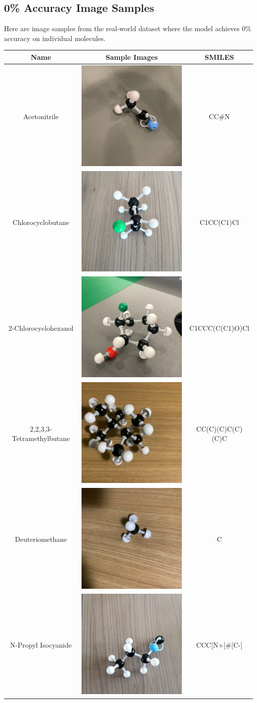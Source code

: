 \documentclass[12pt]{article}
\begin{document}
\subsection*{0\% Accuracy Image Samples}
Here are image samples from the real-world dataset where the model achieves 0\% accuracy on individual molecules. \\
\begin{center}
    \begin{tabular}{c|c|c}
        Name & Sample Images   & SMILES  \\ \hline
        Acetonitrile&  \includegraphics[width=0.15\linewidth]{6342.png} & CC\#N\\ \hline
        Chlorocyclobutane&  \includegraphics[width=0.15\linewidth]{70712.png} & C1CC(C1)Cl\\ \hline
        2-Chlorocyclohexanol&  \includegraphics[width=0.15\linewidth]{15274.png} & C1CCC(C(C1)O)Cl\\ \hline
        2,2,3,3-Tetramethylbutane&  \includegraphics[width=0.15\linewidth]{11675.png} & CC(C)(C)C(C)(C)C\\ \hline
        Deuteriomethane&  \includegraphics[width=0.15\linewidth]{12669.png} & C\\ \hline
        N-Propyl Isocyanide&  \includegraphics[width=0.15\linewidth]{79084.png} & CCC[N+]\#[C-]\\ \hline
\end{tabular}
\end{center}
\end{document}
